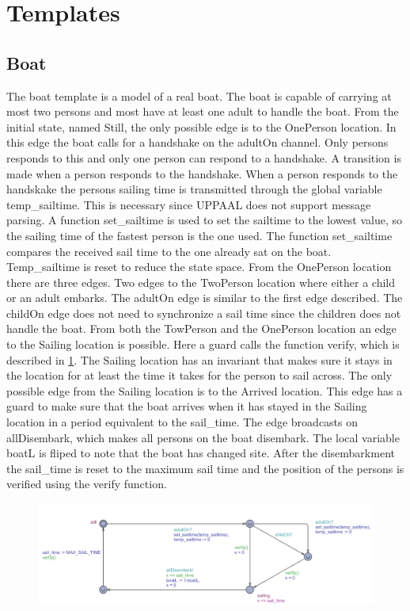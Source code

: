\section{Templates}




\subsection{Boat}
The boat template is a model of a real boat. 
The boat is capable of carrying at most two persons and most have at least one adult to handle the boat. 
From the initial state, named Still, the only possible edge is to the OnePerson location. 
In this edge the boat calls for a handshake on the adultOn channel. 
Only persons responds to this and only one person can respond to a handshake.
A transition is made when a person responds to the handshake.  
When a person responds to the handskake the persons sailing time is transmitted through the global variable temp\_sailtime. 
This is necessary since UPPAAL does not support message parsing. 
A function set\_sailtime is used to set the sailtime to the lowest value, so the sailing time of the fastest person is the one used. 
The function set\_sailtime compares the received sail time to the one already sat on the boat. 
Temp\_sailtime is reset to reduce the state space.
From the OnePerson location there are three edges. 
Two edges to the TwoPerson location where either a child or an adult embarks. 
The adultOn edge is similar to the first edge described. 
The childOn edge does not need to synchronize a sail time since the children does not handle the boat. 
From both the TowPerson and the OnePerson location an edge to the Sailing location is possible. 
Here a guard calls the function verify, which is described in \ref{}. 
The Sailing location has an invariant that makes sure it stays in the location for at least the time it takes for the person to sail across. 
The only possible edge from the Sailing location is to the Arrived location. 
This edge has a guard to make sure that the boat arrives when it has stayed in the Sailing location in a period equivalent to the sail\_time. 
The edge broadcasts on allDisembark, which makes all persons on the boat disembark. 
The local variable boatL is fliped to note that the boat has changed site. 
After the disembarkment the sail\_time is reset to the maximum sail time and the position of the persons is verified using the verify function. 
\begin{figure}%
\includegraphics[width=\columnwidth]{pictures/boat.png}%
\caption{}%
\label{}%
\end{figure}
